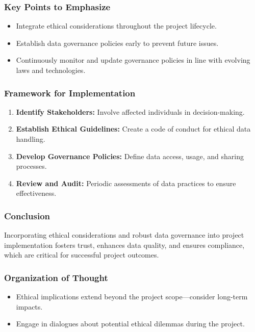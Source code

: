\documentclass{beamer}
\begin{document}
\begin{frame}[fragile]
    \frametitle{Key Points to Emphasize}
    \begin{itemize}
        \item Integrate ethical considerations throughout the project lifecycle.
        \item Establish data governance policies early to prevent future issues.
        \item Continuously monitor and update governance policies in line with evolving laws and technologies.
    \end{itemize}
\end{frame}

\begin{frame}[fragile]
    \frametitle{Framework for Implementation}
    \begin{enumerate}
        \item \textbf{Identify Stakeholders:} Involve affected individuals in decision-making.
        
        \item \textbf{Establish Ethical Guidelines:} Create a code of conduct for ethical data handling.
        
        \item \textbf{Develop Governance Policies:} Define data access, usage, and sharing processes.
        
        \item \textbf{Review and Audit:} Periodic assessments of data practices to ensure effectiveness.
    \end{enumerate}
\end{frame}

\begin{frame}[fragile]
    \frametitle{Conclusion}
    Incorporating ethical considerations and robust data governance into project implementation fosters trust, enhances data quality, and ensures compliance, which are critical for successful project outcomes.
\end{frame}

\begin{frame}[fragile]
    \frametitle{Organization of Thought}
    \begin{itemize}
        \item Ethical implications extend beyond the project scope—consider long-term impacts.
        \item Engage in dialogues about potential ethical dilemmas during the project.
    \end{itemize}
\end{frame}
\end{document}
